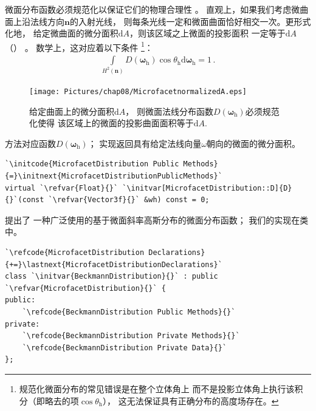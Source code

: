 微面分布函数必须规范化以保证它们的物理合理性
。
直观上，如果我们考虑微曲面上沿法线方向$\bm n$的入射光线，
则每条光线一定和微面曲面恰好相交一次。更形式化地，
给定微曲面的微分面积$\mathrm{d}A$，则该区域之上微面的投影面积
一定等于$\mathrm{d}A$（）
。
数学上，这对应着以下条件
\footnote{规范化微面分布的常见错误是在整个立体角上
    而不是投影立体角上执行该积分（即略去的项$\cos\theta_{\mathrm{h}}$），
    这无法保证具有正确分布的高度场存在。}：
\begin{align*}
    \int\limits_{H^2({\bm n})}D({\bm\omega}_{\mathrm{h}})\cos\theta_{\mathrm{h}}\mathrm{d}{\bm\omega}_{\mathrm{h}}=1\, .
\end{align*}
\begin{figure}[htbp]
    \centering
    \texttt{[image: Pictures/chap08/MicrofacetnormalizedA.eps]}
    \caption{给定曲面上的微分面积$\mathrm{d}A$，
        则微面法线分布函数$D({\bm\omega}_{\mathrm{h}})$必须规范化使得
        该区域上的微面的投影曲面面积等于$\mathrm{d}A$.}
    \label{fig:8.15}
\end{figure}

方法对应函数$D({\bm\omega}_{\mathrm{h}})$；
实现返回具有给定法线向量$\omega$朝向的微面的微分面积。
\begin{lstlisting}
`\initcode{MicrofacetDistribution Public Methods}{=}\initnext{MicrofacetDistributionPublicMethods}`
virtual `\refvar{Float}{}` `\initvar[MicrofacetDistribution::D]{D}{}`(const `\refvar{Vector3f}{}` &wh) const = 0;
\end{lstlisting}

\citet{1987BeckmannSpizzichino}提出了
一种广泛使用的基于微面斜率高斯分布的微面分布函数；
我们的实现在类中。
\begin{lstlisting}
`\refcode{MicrofacetDistribution Declarations}{+=}\lastnext{MicrofacetDistributionDeclarations}`
class `\initvar{BeckmannDistribution}{}` : public `\refvar{MicrofacetDistribution}{}` {
public:
    `\refcode{BeckmannDistribution Public Methods}{}`
private:
    `\refcode{BeckmannDistribution Private Methods}{}`
    `\refcode{BeckmannDistribution Private Data}{}`
};
\end{lstlisting}

